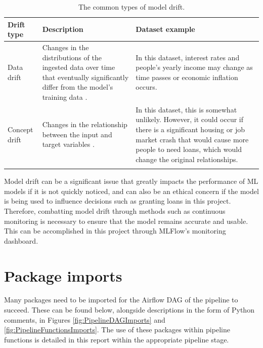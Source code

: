 \documentclass[12pt]{report}
\newcommand{\para}{\vspace{7pt}\noindent}
\begin{document}
\begin{longtable}{ | p{} | p{} | p{} |}
    \hline
    \cellcolor{blue!25}Drift type & \cellcolor{blue!25}Description & \cellcolor{blue!25}Dataset example\\
    \hline
    Data drift & Changes in the distributions of the ingested data over time that eventually significantly differ from the model's training data \autocite{datacamp_understanding_nodate}.
    & In this dataset, interest rates and people's yearly income may change as time passes or economic inflation occurs.\\
    \hline
    Concept drift & Changes in the relationship between the input and target variables \autocite{nigenda_amazon_2022}. 
    & In this dataset, this is somewhat unlikely. However, it could occur if there is a significant housing or job market crash 
    that would cause more people to need loans, which would change the original relationships.\\
    \hline
\caption{The common types of model drift.}\label{tab:Drift}
\end{longtable}

\pagebreak %
\para Model drift can be a significant issue that greatly impacts the performance of ML models if it is not quickly noticed, and can 
also be an ethical concern if the model is being used to influence decisions such as granting loans in this project. 
Therefore, combatting model drift through methods such as continuous monitoring is necessary to ensure that the model remains accurate 
and usable. This can be accomplished in this project through MLFlow's monitoring dashboard.






\section{Package imports}
Many packages need to be imported for the Airflow DAG of the pipeline to succeed. These can be found 
below, alongside descriptions in the form of Python comments, in Figures \ref{fig:PipelineDAGImports} and 
\ref{fig:PipelineFunctionsImports}. The use of these packages within pipeline functions is detailed 
in this report within the appropriate pipeline stage.
\end{document}
